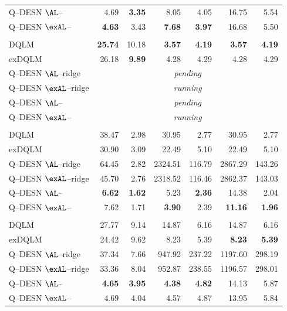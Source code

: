 \begin{longtable}{@{}lrrrrrr@{}}
Q--DESN \(\AL\)--\RHS{} & 4.69 & \textbf{3.35} & 8.05 & 4.05 & 16.75 & 5.54 \\
Q--DESN \(\exAL\)--\RHS{} & \textbf{4.63} & 3.43 & \textbf{7.68} & \textbf{3.97} & 16.68 & 5.50 \\
\addlinespace[0.25em]
\multicolumn{7}{@{}l}{\emph{Gaussian errors, $\tau = 0.50$}}\\
DQLM & \textbf{25.74} & 10.18 & \textbf{3.57} & \textbf{4.19} & \textbf{3.57} & \textbf{4.19} \\
exDQLM & 26.18 & \textbf{9.89} & 4.28 & 4.29 & 4.28 & 4.29 \\
Q--DESN \(\AL\)--ridge & \multicolumn{6}{c}{\emph{pending}} \\
Q--DESN \(\exAL\)--ridge & \multicolumn{6}{c}{\emph{running}} \\
Q--DESN \(\AL\)--\RHS{} & \multicolumn{6}{c}{\emph{pending}} \\
Q--DESN \(\exAL\)--\RHS{} & \multicolumn{6}{c}{\emph{running}} \\
\addlinespace[0.25em]
\multicolumn{7}{@{}l}{\emph{Laplace errors, $\tau = 0.05$}}\\
DQLM & 38.47 & 2.98 & 30.95 & 2.77 & 30.95 & 2.77 \\
exDQLM & 30.90 & 3.09 & 22.49 & 5.10 & 22.49 & 5.10 \\
Q--DESN \(\AL\)--ridge & 64.45 & 2.82 & 2324.51 & 116.79 & 2867.29 & 143.26 \\
Q--DESN \(\exAL\)--ridge & 45.70 & 2.76 & 2318.52 & 116.46 & 2862.37 & 143.03 \\
Q--DESN \(\AL\)--\RHS{} & \textbf{6.62} & \textbf{1.62} & 5.23 & \textbf{2.36} & 14.38 & 2.04 \\
Q--DESN \(\exAL\)--\RHS{} & 7.62 & 1.71 & \textbf{3.90} & 2.39 & \textbf{11.16} & \textbf{1.96} \\
\addlinespace[0.25em]
\multicolumn{7}{@{}l}{\emph{Laplace errors, $\tau = 0.25$}}\\
DQLM & 27.77 & 9.14 & 14.87 & 6.16 & 14.87 & 6.16 \\
exDQLM & 24.42 & 9.62 & 8.23 & 5.39 & \textbf{8.23} & \textbf{5.39} \\
Q--DESN \(\AL\)--ridge & 37.34 & 7.66 & 947.92 & 237.22 & 1197.60 & 298.19 \\
Q--DESN \(\exAL\)--ridge & 33.36 & 8.04 & 952.87 & 238.55 & 1196.57 & 298.01 \\
Q--DESN \(\AL\)--\RHS{} & \textbf{4.65} & \textbf{3.95} & \textbf{4.38} & \textbf{4.82} & 14.13 & 5.87 \\
Q--DESN \(\exAL\)--\RHS{} & 4.69 & 4.04 & 4.57 & 4.87 & 13.95 & 5.84 \\

\end{longtable}
